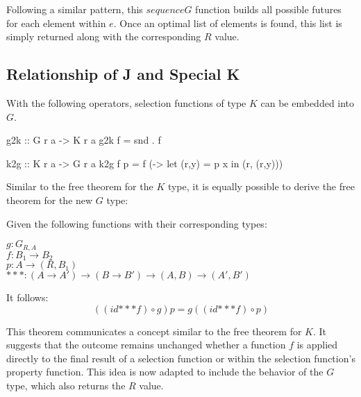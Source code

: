 \documentclass[runningheads]{llncs}
\newenvironment{reasoning}{\begin{adjustwidth}{0.2in}{}\noindent}{\end{adjustwidth}}
\newcommand{\ignore}[1]{}
\begin{document}
Following a similar pattern, this \(sequenceG\) function builds all
possible futures for each element within \(e\). Once an optimal list of
elements is found, this list is simply returned along with the
corresponding \(R\) value.

\subsection{Relationship of J and Special
K}\label{relationship-of-j-and-special-k}

With the following operators, selection functions of type \(K\) can be
embedded into \(G\).

\ignore{

> g2k :: forall r a b. ((a -> (r,b)) -> (r,b)) -> ((a -> (r,b)) -> b)
> g2k f = snd . f

}

\begin{haskell}
g2k :: G r a -> K r a 
g2k f = snd . f
\end{haskell}

\begin{code}
k2g :: K r a -> G r a
k2g f p = f (\x -> let (r,y) = p x in (r, (r,y)))
\end{code}

Similar to the free theorem for the \(K\) type, it is equally possible
to derive the free theorem \cite{wadler1989theorems} for the new \(G\)
type:

\begin{theorem}
Given the following functions with their corresponding types:
\begin{reasoning}
  $g : G_{R,A}$\\
  $f : B_1 \rightarrow B_2$\\
  $p : A \rightarrow (R, B_1)$\\
  $\mathbin{{*}{*}{*}} : (A \rightarrow A') \rightarrow (B \rightarrow B') \rightarrow (A,B) \rightarrow (A',B')$\\
\end{reasoning}
It follows:
\[((id \mathbin{{*}{*}{*}} f) \circ g) p = g ((id \mathbin{{*}{*}{*}} f) \circ p)\]
\end{theorem}

This theorem communicates a concept similar to the free theorem for
\(K\). It suggests that the outcome remains unchanged whether a function
\(f\) is applied directly to the final result of a selection function or
within the selection function's property function. This idea is now
adapted to include the behavior of the \(G\) type, which also returns
the \(R\) value.
\end{document}
